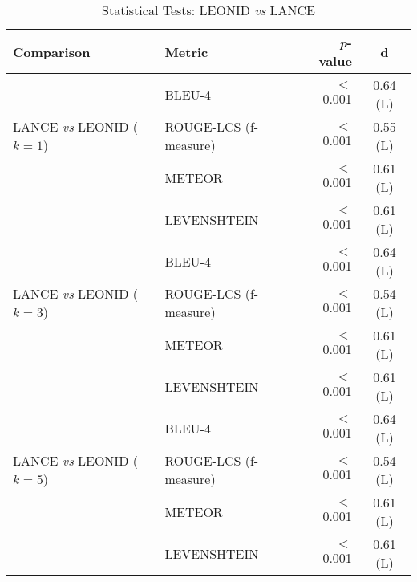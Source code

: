 \begin{table}[ht]
	\centering
	\caption{Statistical Tests: LEONID \emph{vs} LANCE\vspace{-0.2cm}}
	\scriptsize
	\label{tab:test-summarizer}
	\begin{tabular}{llrc}
		\toprule
		\textbf{Comparison} & \textbf{Metric} & \textbf{\emph{p}-value} & \textbf{d} \\ 
		\midrule
		\multirow{3}{*}{LANCE  \emph{vs} LEONID ($k=1$)} & BLEU-4 & $<$0.001 & 0.64 (L) \\ 
		& ROUGE-LCS (f-measure) & $<$0.001 & 0.55 (L) \\ 
		& METEOR & $<$0.001 & 0.61 (L) \\
			& LEVENSHTEIN & $<$0.001 & 0.61 (L) \\\midrule
		\multirow{3}{*}{LANCE  \emph{vs} LEONID ($k=3$)} & BLEU-4 & $<$0.001 & 0.64 (L) \\ 
		& ROUGE-LCS (f-measure) & $<$0.001 & 0.54 (L) \\ 
		& METEOR & $<$0.001 & 0.61 (L) \\
			& LEVENSHTEIN & $<$0.001 & 0.61 (L) \\\midrule
			\multirow{3}{*}{LANCE  \emph{vs} LEONID ($k=5$)} & BLEU-4 & $<$0.001 & 0.64 (L) \\ 
		& ROUGE-LCS (f-measure) & $<$0.001 & 0.54 (L) \\ 
		& METEOR & $<$0.001 & 0.61 (L) \\
			& LEVENSHTEIN & $<$0.001 & 0.61 (L) \\\midrule
	\end{tabular}
	\vspace{-0.2cm}
\end{table}